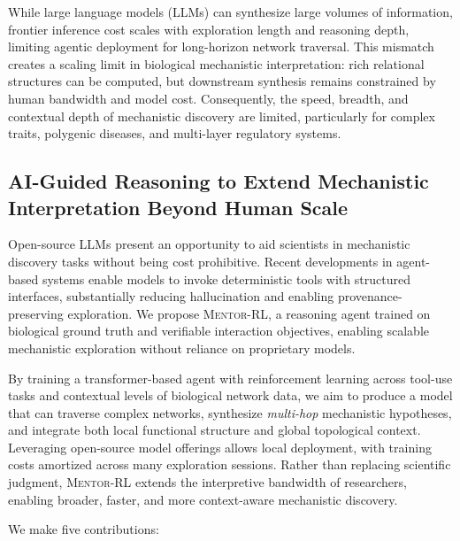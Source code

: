 \documentclass[thesis,letterpaper,12pt]{utthesis}
\begin{document}
While large language models (LLMs) can synthesize large volumes of information, frontier inference cost scales with exploration length and reasoning depth, limiting agentic deployment for long-horizon network traversal. This mismatch creates a scaling limit in biological mechanistic interpretation: rich relational structures can be computed, but downstream synthesis remains constrained by human bandwidth and model cost. Consequently, the speed, breadth, and contextual depth of mechanistic discovery are limited, particularly for complex traits, polygenic diseases, and multi-layer regulatory systems.

\subsection{AI-Guided Reasoning to Extend Mechanistic Interpretation Beyond Human Scale}
Open-source LLMs present an opportunity to aid scientists in mechanistic discovery tasks without being cost prohibitive. Recent developments in agent-based systems enable models to invoke deterministic tools with structured interfaces, substantially reducing hallucination and enabling provenance-preserving exploration. We propose \textsc{Mentor-RL}, a reasoning agent trained on biological ground truth and verifiable interaction objectives, enabling scalable mechanistic exploration without reliance on proprietary models.

By training a transformer-based agent with reinforcement learning across tool-use tasks and contextual levels of biological network data, we aim to produce a model that can traverse complex networks, synthesize \textit{multi-hop} mechanistic hypotheses, and integrate both local functional structure and global topological context. Leveraging open-source model offerings allows local deployment, with training costs amortized across many exploration sessions. Rather than replacing scientific judgment, \textsc{Mentor-RL} extends the interpretive bandwidth of researchers, enabling broader, faster, and more context-aware mechanistic discovery.

We make five contributions: 
\end{document}
